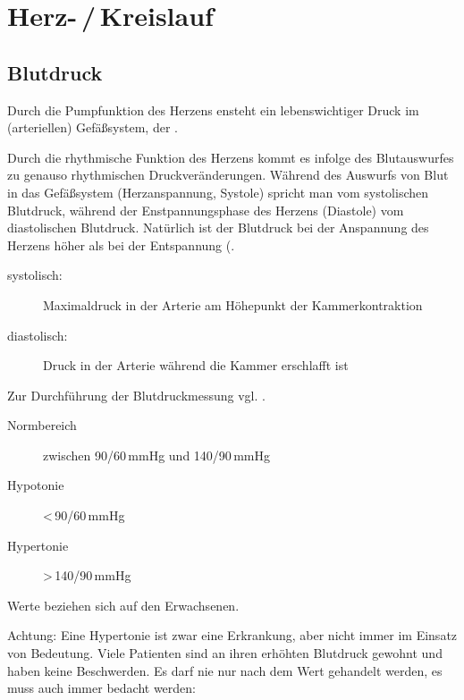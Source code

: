\clearpage
\section[Herz- / Kreislauf]{Herz-\,/\,Kreislauf}
\label{bkm:RefHeading42514202}


\subsection{Blutdruck} 
\label{topic:blutdruck}

Durch die Pumpfunktion des Herzens ensteht ein
lebenswichtiger Druck im (arteriellen) Gefäßsystem, der
.

\gMarried
{Durch die rhythmische Funktion des
Herzens kommt es infolge des Blutauswurfes zu genauso rhythmischen Druckveränderungen.
Während des Auswurfs von Blut in das
Gefäßsystem (Herzanspannung, Systole)
spricht man vom systolischen Blutdruck, während
der Enstpannungsphase des Herzens (Diastole) vom
diastolischen Blutdruck. Natürlich ist der Blutdruck bei
der Anspannung des Herzens höher als bei der Entspannung
(.}
{

\begin{description}
    \item[systolisch:] Maximaldruck in der Arterie am Höhepunkt der
Kammerkontraktion
    \item[diastolisch:] Druck in der Arterie während die Kammer erschlafft ist
\end{description}}

Zur Durchführung der Blutdruckmessung vgl.
.



\begin{description}
    \item[Normbereich] zwischen 90/60\,mmHg und
    140/90\,mmHg 
    \item[Hypotonie] {\textless}\,90/60\,mmHg
    \item[Hypertonie] {\textgreater}\,140/90\,mmHg
\end{description}

{\tiny Werte beziehen sich auf den Erwachsenen.}

Achtung: Eine Hypertonie ist zwar eine Erkrankung, aber nicht immer im
Einsatz von Bedeutung. Viele Patienten sind an ihren erhöhten
Blutdruck gewohnt und haben keine Beschwerden. Es darf nie nur nach dem
Wert gehandelt werden, es muss auch immer bedacht werden: 

